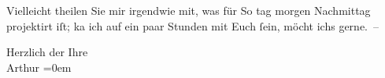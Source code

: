 \pstart
           {\pb}Vielleicht theilen Sie mir irgendwie mit, was
                    für So {\geminationn}tag morgen
                        Nachmittag projektirt iſt; ka{\geminationn} ich
                    auf ein paar Stunden mit Euch{ }ſein, möcht ichs gerne. –\pend
           
\pstart
           Herzlich der Ihre {\\[\baselineskip]}\spacefill\mbox{Arthur}\pend
           \leftskip=0em{}\endnumbering{}  \newcommand{\dateiname}{L00204}\newcommand{\titel}{Arthur Schnitzler an Richard Beer-Hofmann, [29. 4. 1893?]}\newcommand{\editorInnen}{Martin Anton Müller und Gerd-Hermann Susen}
